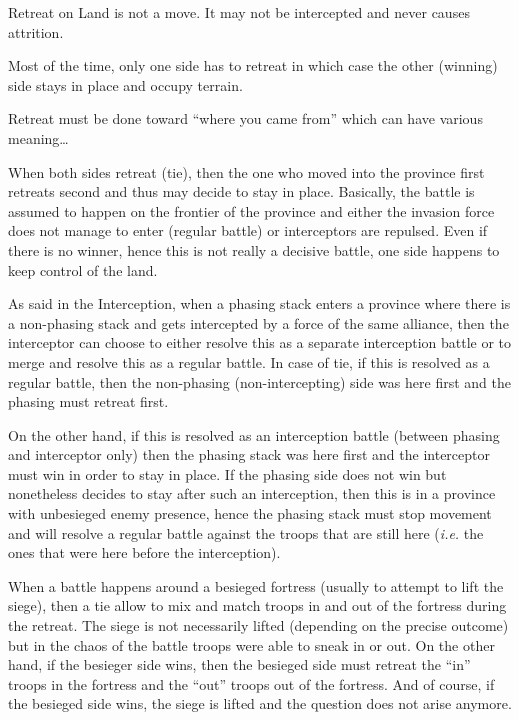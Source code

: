 Retreat on Land is not a move. It may not be intercepted and never causes
attrition.

\begin{designnote}
  Most of the time, only one side has to retreat in which case the other
  (winning) side stays in place and occupy terrain.

  Retreat must be done toward ``where you came from'' which can have various
  meaning\ldots

  When both sides retreat (tie), then the one who moved into the province
  first retreats second and thus may decide to stay in place. Basically, the
  battle is assumed to happen on the frontier of the province and either the
  invasion force does not manage to enter (regular battle) or interceptors are
  repulsed. Even if there is no winner, hence this is not really a decisive
  battle, one side happens to keep control of the land.

  \smallskip

  As said in the Interception, when a phasing stack enters a province where
  there is a non-phasing stack and gets intercepted by a force of the same
  alliance, then the interceptor can choose to either resolve this as a
  separate interception battle or to merge and resolve this as a regular
  battle. In case of tie, if this is resolved as a regular battle, then the
  non-phasing (non-intercepting) side was here first and the phasing must
  retreat first.

  On the other hand, if this is resolved as an interception battle (between
  phasing and interceptor only) then the phasing stack was here first and the
  interceptor must win in order to stay in place. If the phasing side does not
  win but nonetheless decides to stay after such an interception, then this is
  in a province with unbesieged enemy presence, hence the phasing stack must
  stop movement and will resolve a regular battle against the troops that are
  still here (\emph{i.e.} the ones that were here before the interception).

  \smallskip

  When a battle happens around a besieged fortress (usually to attempt to lift
  the siege), then a tie allow to mix and match troops in and out of the
  fortress during the retreat. The siege is not necessarily lifted (depending
  on the precise outcome) but in the chaos of the battle troops were able to
  sneak in or out. On the other hand, if the besieger side wins, then the
  besieged side must retreat the ``in'' troops in the fortress and the ``out''
  troops out of the fortress. And of course, if the besieged side wins, the
  siege is lifted and the question does not arise anymore.
\end{designnote}


